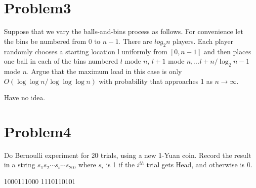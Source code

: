 \documentclass[12pt]{article}
\begin{document}
\section{Problem3}
Suppose that we vary the balls-and-bins process as follows. For convenience let the bins
be numbered from 0 to $n-1$. There are $log_2n$ players. Each player randomly chooses a
starting location l uniformly from $[0, n-1]$ and then places one ball in each of the bins
numbered $l$ mode $n$, $l + 1$ mode $n,\dots l+n/ \log_{2}n -1$ mode $n$. Argue that the maximum
load in this case is only $O(\log \log n / \log \log \log n)$ with probability that approaches 1 as
$n \to \infty$.

Have no idea.


\section{Problem4}
Do Bernoulli experiment for 20 trials, using a new 1-Yuan coin. Record the result in a
string $s_1s_2 \cdots s_i \cdots s_{20}$, where $s_i$ is 1 if the $i^{th}$ trial gets Head, and otherwise is 0.

1000111000 1110110101
\end{document}
